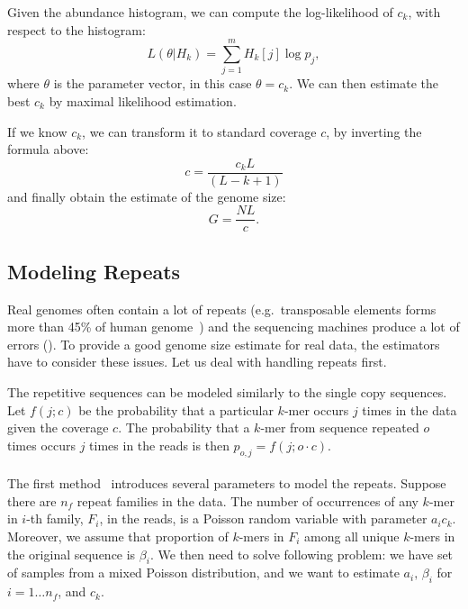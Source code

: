 Given the abundance histogram, we can compute the log-likelihood of $c_k$, with respect to the histogram:
$$L(\theta | H_k) = \sum_{j=1}^m H_k[j] \log p_j,$$
where $\theta$ is the parameter vector, in this case $\theta = c_k$.
We can then estimate the best $c_k$ by maximal likelihood estimation.

If we know $c_k$, we can transform it to standard coverage $c$, by inverting the formula above:
$$c = \frac{c_k L}{(L - k + 1)}$$
and finally obtain the estimate of the genome size:
$$G = \frac{NL}{c}.$$

\subsection{Modeling Repeats}\label{subsec:repeatmodles}

Real genomes often contain a lot of repeats (e.g.\ transposable elements forms more than 45\% of human genome~\cite{biemont2006genetics}) and the sequencing machines produce a lot of errors (). To provide a good genome size estimate for real data, the estimators have to consider these issues. Let us deal with handling repeats first.

The repetitive sequences can be modeled similarly to the single copy sequences. Let $f(j; c)$ be the probability that a particular $k$-mer occurs $j$ times in the data given the coverage $c$. The probability that a $k$-mer from sequence repeated $o$ times occurs $j$ times in the reads is then $p_{o,j} = f(j; o\cdot c)$.

\paragraph{}
The first method~\cite{waterman} introduces several parameters to model the repeats.
Suppose there are $n_f$ repeat families in the data. The number of occurrences of any $k$-mer in $i$-th family, $F_i$, in the reads, is a Poisson random variable with parameter $a_i c_k$. Moreover, we assume that proportion of $k$-mers in $F_i$ among all unique $k$-mers in the original sequence is $\beta_i$.
We then need to solve following problem: we have set of samples from a mixed Poisson distribution, and we want to estimate $a_i,\,\beta_i$ for $i = 1\dots n_f$, and $c_k$.

